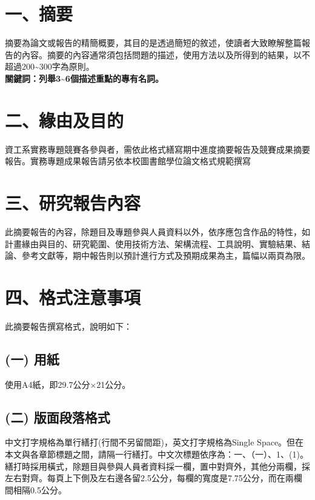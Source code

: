 \documentclass[]{NTUTCSIEproject}
\begin{document}

\setlength{\columnsep}{0.5cm}
\twocolumn[\makeptitle]

\section*{一、摘要}

摘要為論文或報告的精簡概要，其目的是透過簡短的敘述，使讀者大致瞭解整篇報告的內容。摘要的內容通常須包括問題的描述，使用方法以及所得到的結果，以不超過200\textasciitilde300字為原則。
\\\textbf{關鍵詞：列舉3\textasciitilde6個描述重點的專有名詞。}

\section*{二、緣由及目的}

資工系實務專題競賽各參與者，需依此格式繕寫期中進度摘要報告及競賽成果摘要報告。實務專題成果報告請另依本校圖書館學位論文格式規範撰寫

\section*{三、研究報告內容}

此摘要報告的內容，除題目及專題參與人員資料以外，依序應包含作品的特性，如計畫緣由與目的、研究範圍、使用技術方法、架構流程、工具說明、實驗結果、結論、參考文獻等，期中報告則以預計進行方式及預期成果為主，篇幅以兩頁為限。

\section*{四、格式注意事項}

此摘要報告撰寫格式，說明如下：

\subsection*{(一) 用紙}

使用A4紙，即29.7公分×21公分。

\subsection*{(二) 版面段落格式}

中文打字規格為單行繕打(行間不另留間距)，英文打字規格為Single Space。但在本文與各章節標題之間，請隔一行繕打。中文次標題依序為：一、（一）、1、(1)。
繕打時採用橫式，除題目與參與人員者資料採一欄，置中對齊外，其他分兩欄，採左右對齊。每頁上下側及左右邊各留2.5公分，每欄的寬度是7.75公分，而在兩欄間相隔0.5公分。
\end{document}
